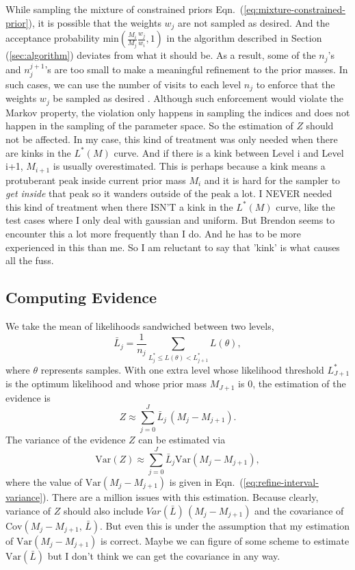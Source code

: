 \documentclass[letterpaper, preprint]{aastex}
\newcommand{\qer}[1]{{\color{red}#1}}
\begin{document}
While sampling the mixture of constrained priors Eqn.~(\ref{eq:mixture-constrained-prior}), it is possible that the weights $w_j$ are not sampled as desired. And the acceptance probability $\mathrm{min}\left(\frac{M_i}{M_j}\frac{w_j}{w_i},1\right)$ in the algorithm described in Section (\ref{sec:algorithm}) deviates from what it should be. As a result, some of the $n_j$'s and $n_j^{j+1}$'s are too small to make a meaningful refinement to the prior masses. In such cases, we can use the number of visits to each level $n_j$ to enforce that the weights $w_j$ be sampled as desired \citep{brewer11a}. Although such enforcement would violate the Markov property, the violation only happens in sampling the indices and does not happen in the sampling of the parameter space. So the estimation of $Z$ should not be affected. 
\qer{In my case, this kind of treatment was only needed when there are kinks in the $L^*(M)$ curve. And if there is a kink between Level i and Level i+1, $M_{i+1}$ is usually overestimated. This is perhaps because a kink means a protuberant peak inside current prior mass $M_i$ and it is hard for the sampler to \textit{get inside} that peak so it wanders outside of the peak a lot. I NEVER needed this kind of treatment when there ISN'T a kink in the $L^*(M)$ curve, like the test cases where I only deal with gaussian and uniform. But Brendon seems to encounter this a lot more frequently than I do. And he has to be more experienced in this than me. So I am reluctant to say that 'kink' is what causes all the fuss.}

\subsection{Computing Evidence}
We take the mean of likelihoods sandwiched between two levels,
\begin{equation}
\bar{L}_j= \frac{1}{n_j}\sum_{L_j^*\leq L(\theta)<L_{j+1}^*} L(\theta),
\end{equation}
where $\theta$ represents samples. With one extra level whose likelihood threshold $L^*_{J+1}$ is the optimum likelihood and whose prior mass $M_{J+1}$ is 0, the estimation of the evidence is
\begin{equation}
Z \approx \sum_{j=0}^{J} \bar{L}_j \, (M_j - M_{j+1}).
\end{equation}
The variance of the evidence $Z$ can be estimated via
\begin{equation}
\mathrm{Var}(Z) \approx \sum_{j=0}^{J} \bar{L}_j \mathrm{Var}(M_j-M_{j+1}),
\end{equation}
where the value of $\mathrm{Var}(M_j-M_{j+1})$ is given in Eqn.~(\ref{eq:refine-interval-variance}). 
\qer{There are a million issues with this estimation. Because clearly, variance of $Z$ should also include $Var(\bar{L})\,(M_j-M_{j+1})$ and the covariance of $\mathrm{Cov}\left(M_j-M_{j+1},\,\bar{L}\right)$. But even this is under the assumption that my estimation of $\mathrm{Var}(M_j-M_{j+1})$ is correct. Maybe we can figure of some scheme to estimate $\mathrm{Var}(\bar{L})$ but I don't think we can get the covariance in any way.}
\end{document}

